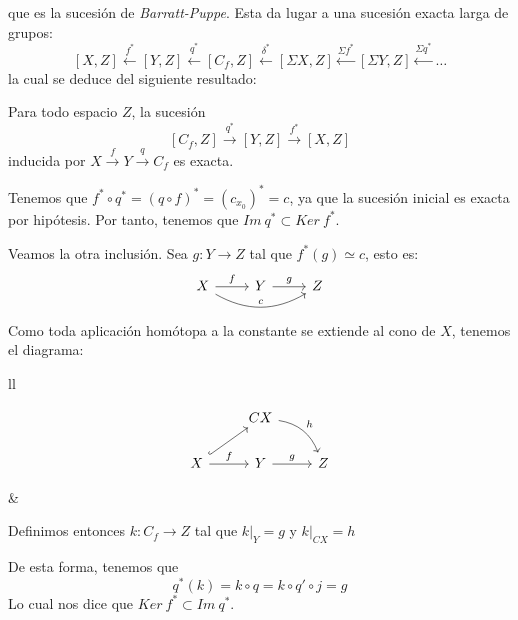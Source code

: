 que es la sucesión de \textit{Barratt-Puppe}. Esta da lugar a una sucesión exacta larga de grupos:
\[ [X, Z] \stackrel{f^*}{\longleftarrow} [Y, Z] \stackrel{q^*}{\longleftarrow} [C_f, Z] \stackrel{\delta^*}{\longleftarrow} [\Sigma X, Z] \stackrel{\Sigma f^*}{\longleftarrow} [\Sigma Y, Z] \stackrel{\Sigma q^*}{\longleftarrow} \dots \]
la cual se deduce del siguiente resultado:
\begin{teor}
Para todo espacio $Z$, la sucesión 
\[ [C_f, Z] \stackrel{q^*}{\longrightarrow} [Y, Z] \stackrel{f^*}{\longrightarrow} [X, Z] \]
inducida por $X \stackrel{f}{\longrightarrow} Y \stackrel{q}{\longrightarrow} C_f$ es exacta.
\end{teor}
\begin{demo}
Tenemos que $ f^* \circ q^* = (q \circ f)^* = (c_{x_0})^* = c$, ya que la sucesión inicial es exacta por hipótesis. Por tanto, tenemos que $Im \ q^* \subset Ker \ f^* $.\par 
Veamos la otra inclusión. Sea $g : Y \longrightarrow Z$ tal que $f^*(g) \simeq c$, esto es:
\[
\begin{tikzcd}
X \rar{f} \arrow[bend right]{rr}{c} & Y \rar{g} & Z
\end{tikzcd}
\]
Como toda aplicación homótopa a la constante se extiende al cono de $X$, tenemos el diagrama: \par
\begin{tabular}{ll}
\begin{minipage}{0.4\textwidth}
\[
\begin{tikzcd}
{} & CX \arrow[bend left]{rd}{h} &  \\
X \rar{f} \arrow[hook]{ur}  & Y \rar{g}  & Z
\end{tikzcd}
\]
\end{minipage}
&
\begin{minipage}{0.55\textwidth}
Definimos entonces $k : C_f \longrightarrow Z$ tal que $k\vert_Y = g$ y $k \vert_{CX} = h$ \par
De esta forma, tenemos que 
\[
q^*(k) = k \circ q = k \circ q' \circ j = g
\]
Lo cual nos dice que $Ker \ f^* \subset Im \ q^*$.
\end{minipage}
\end{tabular}
\end{demo}

